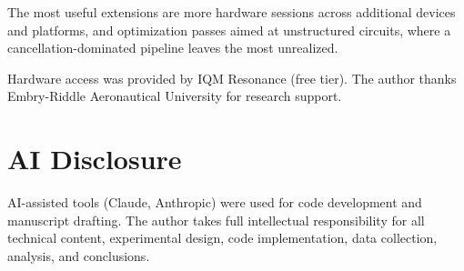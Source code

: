 \documentclass[sigconf,nonacm]{acmart}
\begin{document}
The most useful extensions are more hardware sessions across additional devices and platforms, and optimization passes aimed at unstructured circuits, where a cancellation-dominated pipeline leaves the most unrealized.

\begin{acks}
Hardware access was provided by IQM Resonance (free tier). The author thanks Embry-Riddle Aeronautical University for research support.
\end{acks}

\section*{AI Disclosure}

AI-assisted tools (Claude, Anthropic) were used for code development and manuscript drafting. The author takes full intellectual responsibility for all technical content, experimental design, code implementation, data collection, analysis, and conclusions.

\end{document}

